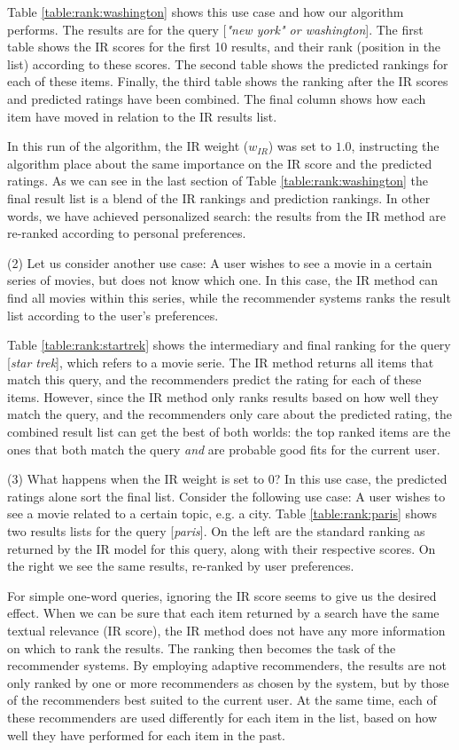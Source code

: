 Table \ref{table:rank:washington} shows this use case and how our algorithm performs.
The results are for the query [\emph{"new york" or washington}].
The first table shows the IR scores for the first 10 results,
and their rank (position in the list) according to these scores.
The second table shows the predicted rankings for each of these items.
Finally, the third table shows the ranking after the IR scores
and predicted ratings have been combined.
The final column shows how each item have moved in relation to the 
IR results list.

In this run of the algorithm, the IR weight ($w_{IR}$) was set to $1.0$,
instructing the algorithm place about the same importance on the IR score
and the predicted ratings. As we can see in the last section of 
Table \ref{table:rank:washington} the final result list is a blend
of the IR rankings and prediction rankings.
In other words, we have achieved personalized search: the results
from the IR method are re-ranked according to personal preferences.


(2) Let us consider another use case:
A user wishes to see a movie in a certain series of movies,
but does not know which one. In this case, the IR method can find all movies within this series,
while the recommender systems ranks the result list according to the user's preferences.

Table \ref{table:rank:startrek} shows the intermediary and final ranking
for the query [\emph{star trek}], which refers to a movie serie.
The IR method returns all items that match this query,
and the recommenders predict the rating for each of these items.
However, since the IR method only ranks results based on how well they match the query,
and the recommenders only care about the predicted rating, the combined result
list can get the best of both worlds:
the top ranked items are the ones that both match the query \emph{and}
are probable good fits for the current user.

(3) What happens when the IR weight is set to $0$?
In this use case, the predicted ratings alone sort the final list.
Consider the following use case:
A user wishes to see a movie related to a certain topic, e.g. a city.
Table \ref{table:rank:paris} shows two results lists for the query [\emph{paris}].
On the left are the standard ranking as returned by the IR model for this query,
along with their respective scores.
On the right we see the same results, re-ranked by user preferences.

For simple one-word queries, ignoring the IR score seems to give us the desired effect.
When we can be sure that each item returned by a search have the same textual relevance
(IR score), the IR method does not have any more information on which to rank
the results. The ranking then becomes the task of the recommender systems.
By employing adaptive recommenders, the results are not only ranked by 
one or more recommenders as chosen by the system, but by those of the recommenders
best suited to the current user. At the same time, each of these recommenders
are used differently for each item in the list, based on how well they have
performed for each item in the past.

